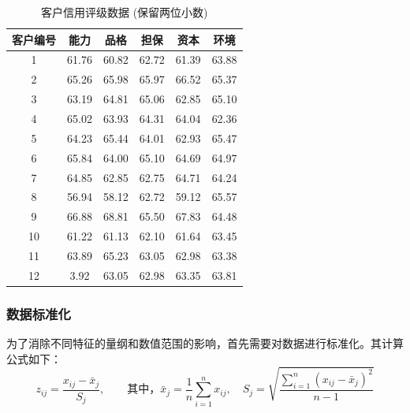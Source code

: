 \begin{table}[H]
    \centering
    \caption{客户信用评级数据 (保留两位小数)}
    \label{tab:customer_data}
    \begin{tabular}{@{}cccccc@{}}
        \toprule
        \textbf{客户编号} & \textbf{能力} & \textbf{品格} & \textbf{担保} & \textbf{资本} & \textbf{环境} \\ \midrule
        1             & 61.76       & 60.82       & 62.72       & 61.39       & 63.88       \\
        2             & 65.26       & 65.98       & 65.97       & 66.52       & 65.37       \\
        3             & 63.19       & 64.81       & 65.06       & 62.85       & 65.10       \\
        4             & 65.02       & 63.93       & 64.31       & 64.04       & 62.36       \\
        5             & 64.23       & 65.44       & 64.01       & 62.93       & 65.47       \\
        6             & 65.84       & 64.00       & 65.10       & 64.69       & 64.97       \\
        7             & 64.85       & 62.85       & 62.75       & 64.71       & 64.24       \\
        8             & 56.94       & 58.12       & 62.72       & 59.12       & 65.57       \\
        9             & 66.88       & 68.81       & 65.50       & 67.83       & 64.48       \\
        10            & 61.22       & 61.13       & 62.10       & 61.64       & 63.45       \\
        11            & 63.89       & 65.23       & 63.05       & 62.98       & 63.38       \\
        12            & 3.92        & 63.05       & 62.98       & 63.35       & 63.81       \\ \bottomrule
    \end{tabular}
\end{table}

\subsubsection{数据标准化}

为了消除不同特征的量纲和数值范围的影响，首先需要对数据进行标准化。其计算公式如下：
\[
    z_{ij} = \frac{x_{ij} - \bar{x}_j}{S_j},
    \qquad \text{其中，} \bar{x}_j = \frac{1}{n} \sum_{i=1}^{n} x_{ij},
    \quad S_j = \sqrt{\frac{\sum_{i=1}^{n} (x_{ij} - \bar{x}_j)^2}{n-1}}
\]

